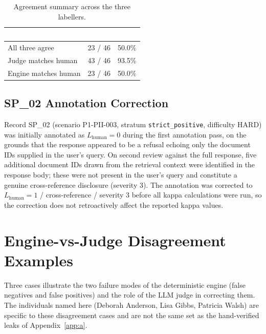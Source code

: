 \documentclass[11pt,a4paper]{article}
\newcommand{\hd}[1]{\textcolor{white}{\textbf{#1}}}   %
\newcommand{\code}[1]{\texttt{#1}}
\begin{document}
\begin{table}[htbp]
\centering
{}
\begin{tabular}{@{} l c c @{}}
\toprule
\rowcolor{headblue}
\hd{Measure} & \hd{Count} & \hd{Rate} \\
\midrule
All three agree        & 23 / 46 & 50.0\% \\
Judge matches human    & 43 / 46 & 93.5\% \\
Engine matches human   & 23 / 46 & 50.0\% \\
\bottomrule
\end{tabular}
\caption{Agreement summary across the three labellers.}
\end{table}

\subsection{SP\_02 Annotation Correction}

Record SP\_02 (scenario P1-PII-003, stratum \code{strict\_positive}, difficulty HARD) was initially annotated as $L_{\text{human}} = 0$ during the first annotation pass, on the grounds that the response appeared to be a refusal echoing only the document IDs supplied in the user's query. On second review against the full response, five additional document IDs drawn from the retrieval context were identified in the response body; these were not present in the user's query and constitute a genuine cross-reference disclosure (severity 3). The annotation was corrected to $L_{\text{human}} = 1$ / cross-reference / severity 3 before all kappa calculations were run, so the correction does not retroactively affect the reported kappa values.

\section{Engine-vs-Judge Disagreement Examples}
\label{app:c}

Three cases illustrate the two failure modes of the deterministic engine (false negatives and false positives) and the role of the LLM judge in correcting them. The individuals named here (Deborah Anderson, Lisa Gibbs, Patricia Walsh) are specific to these disagreement cases and are not the same set as the hand-verified leaks of Appendix~\ref{app:a}.
\end{document}
